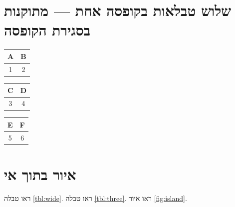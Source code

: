 \section{שלוש טבלאות בקופסה אחת — מתוקנות בסגירת הקופסה}
\begin{tablebox}\centering\small
\begin{otherlanguage}{english}
\begin{tabular}{|c|c|}\hline A & B \\ \hline 1 & 2 \\ \hline\end{tabular}

\smallskip
\begin{tabular}{|c|c|}\hline C & D \\ \hline 3 & 4 \\ \hline\end{tabular}

\smallskip
\begin{tabular}{|c|c|}\hline E & F \\ \hline 5 & 6 \\ \hline\end{tabular}
\end{otherlanguage}
\end{tablebox}

\section{איור בתוך אי}
\begin{tikzpic}
\end{tikzpic}

ראו טבלה \ref{tbl:wide}.
ראו טבלה \ref{tbl:three}.
ראו איור \ref{fig:island}.

